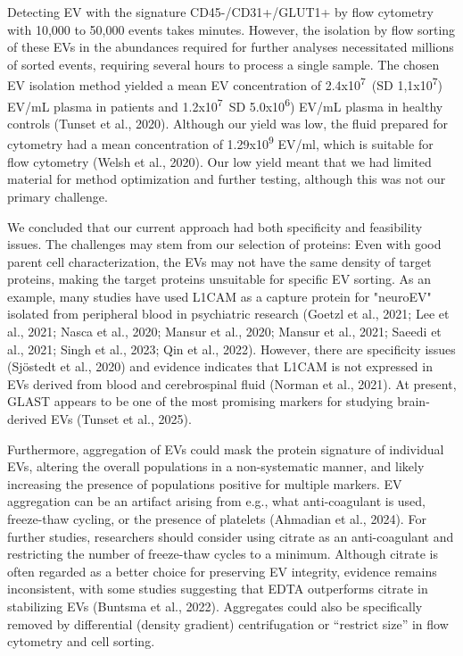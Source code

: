 \documentclass[authordate, empirical]{jote-new-article}
\begin{document}
	Detecting EV with the signature CD45-/CD31+/GLUT1+ by flow cytometry with 10,000 to 50,000 events takes minutes. However, the isolation by flow sorting of these EVs in the abundances required for further analyses necessitated millions of sorted events, requiring several hours to process a single sample. The chosen EV isolation method yielded a mean EV concentration of 2.4x10\textsuperscript{7} (SD 1,1x10\textsuperscript{7}) EV/mL plasma in patients and 1.2x10\textsuperscript{7} SD 5.0x10\textsuperscript{6}) EV/mL plasma in healthy controls (Tunset et al., 2020). Although our yield was low, the fluid prepared for cytometry had a mean concentration of 1.29x10\textsuperscript{9} EV/ml, which is suitable for flow cytometry (Welsh et al., 2020). Our low yield meant that we had limited material for method optimization and further testing, although this was not our primary challenge. 



	We concluded that our current approach had both specificity and feasibility issues. The challenges may stem from our selection of proteins: Even with good parent cell characterization, the EVs may not have the same density of target proteins, making the target proteins unsuitable for specific EV sorting. As an example, many studies have used L1CAM as a capture protein for "neuroEV" isolated from peripheral blood in psychiatric research (Goetzl et al., 2021; Lee et al., 2021; Nasca et al., 2020; Mansur et al., 2020; Mansur et al., 2021; Saeedi et al., 2021; Singh et al., 2023; Qin et al., 2022). However, there are specificity issues (Sjöstedt et al., 2020) and evidence indicates that L1CAM is not expressed in EVs derived from blood and cerebrospinal fluid (Norman et al., 2021). At present, GLAST appears to be one of the most promising markers for studying brain-derived EVs (Tunset et al., 2025).



	Furthermore, aggregation of EVs could mask the protein signature of individual EVs, altering the overall populations in a non-systematic manner, and likely increasing the presence of populations positive for multiple markers. EV aggregation can be an artifact arising from e.g., what anti-coagulant is used, freeze-thaw cycling, or the presence of platelets (Ahmadian et al., 2024). For further studies, researchers should consider using citrate as an anti-coagulant and restricting the number of freeze-thaw cycles to a minimum. Although citrate is often regarded as a better choice for preserving EV integrity, evidence remains inconsistent, with some studies suggesting that EDTA outperforms citrate in stabilizing EVs (Buntsma et al., 2022). Aggregates could also be specifically removed by differential (density gradient) centrifugation or “restrict size” in flow cytometry and cell sorting.
\end{document}
